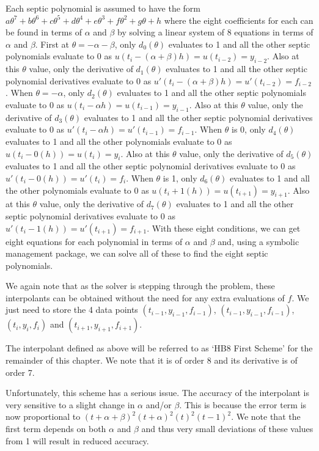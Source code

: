 Each septic polynomial is assumed to have the form $a\theta^7 + b\theta^6 + c\theta^5 + d\theta^4 + e\theta^3 + f\theta^2 + g\theta + h$ where the eight coefficients for each can be found in terms of $\alpha$ and $\beta$ by solving a linear system of 8 equations in terms of $\alpha$ and $\beta$. First at $\theta = -\alpha-\beta$, only $d_0(\theta)$ evaluates to 1 and all the other septic polynomials evaluate to 0 as $u(t_i - (\alpha+\beta) h) = u(t_{i - 2}) = y_{i - 2}$. Also at this $\theta$ value, only the derivative of $d_1(\theta)$ evaluates to 1 and all the other septic polynomial derivatives evaluate to 0 as $u'(t_i - (\alpha+\beta) h) = u'(t_{i - 2}) = f_{i - 2}$. When $\theta = -\alpha$, only $d_2(\theta)$ evaluates to 1 and all the other septic polynomials evaluate to 0 as $u(t_i - \alpha h) = u(t_{i - 1}) = y_{i - 1}$. Also at this $\theta$ value, only the derivative of $d_3(\theta)$ evaluates to 1 and all the other septic polynomial derivatives evaluate to 0 as $u'(t_i - \alpha h) = u'(t_{i - 1}) = f_{i - 1}$. When $\theta$ is 0, only $d_4(\theta)$ evaluates to 1 and all the other polynomials evaluate to 0 as $u(t_i - 0(h)) = u(t_i) = y_i$. Also at this $\theta$ value, only the derivative of $d_5(\theta)$ evaluates to 1 and all the other septic polynomial derivatives evaluate to 0 as $u'(t_i - 0(h)) = u'(t_i) = f_i$. When $\theta$ is 1, only $d_6(\theta)$ evaluates to 1 and all the other polynomials evaluate to 0 as $u(t_i + 1(h)) = u(t_{i+1}) = y_{i+1}$. Also at this $\theta$ value, only the derivative of $d_7(\theta)$ evaluates to 1 and all the other septic polynomial derivatives evaluate to 0 as $u'(t_i - 1(h)) = u'(t_{i+1}) = f_{i+1}$. With these eight conditions, we can get eight equations for each polynomial in terms of $\alpha$ and $\beta$ and, using a symbolic management package, we can solve all of these to find the eight septic polynomials.

We again note that as the solver is stepping through the problem, these interpolants can be obtained without the need for any extra evaluations of $f$. We just need to store the 4 data points $(t_{i-1}, y_{i - 1}, f_{i - 1})$, $(t_{i-1}, y_{i - 1}, f_{i - 1})$, $(t_i, y_i, f_i)$ and $(t_{i + 1}, y_{i + 1}, f_{i + 1})$.

The interpolant defined as above will be referred to as `HB8 First Scheme' for the remainder of this chapter. We note that it is of order 8 and its derivative is of order 7.

Unfortunately, this scheme has a serious issue. The accuracy of the interpolant is very sensitive to a slight change in $\alpha$ and/or $\beta$. This is because the error term is now proportional to $(t + \alpha + \beta)^2(t+\alpha)^2(t)^2(t-1)^2$. We note that the first term depends on both $\alpha$ and $\beta$ and thus very small deviations of these values from 1 will result in reduced accuracy. 


